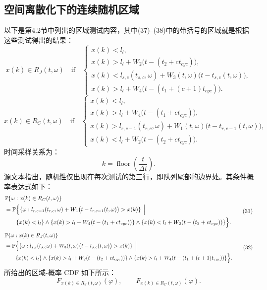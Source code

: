 \documentclass{article}
\begin{document}
\subsection*{空间离散化下的连续随机区域}
以下是第4.2节中列出的区域测试内容，其中(37)--(38)中的带括号的区域就是根据这些测试得出的结果：
\begin{equation}
x(k)\in R_J(t,\omega)\quad\text{if}\quad
\begin{cases}
x(k)<l_l,\\
x(k)>l_l+W_2\bigl(t-(t_2+ct_{cyc})\bigr),\\
x(k)<l_{s,c}(t_{s,c},\omega)+W_3(t,\omega)\bigl(t-t_{s,c}(t,\omega)\bigr),\\
x(k)>l_l+W_4\bigl(t-(t_1+(c+1)t_{cyc})\bigr).
\end{cases}
\tag{29}
\end{equation}
\begin{equation}
x(k)\in R_C(t,\omega)\quad\text{if}\quad
\begin{cases}
x(k)<l_l,\\
x(k)>l_l+W_4\bigl(t-(t_1+ct_{cyc})\bigr),\\
x(k)>l_{r,c-1}(t_{r,c},\omega)+W_1(t,\omega)\bigl(t-t_{r,c-1}(t,\omega)\bigr),\\
x(k)<l_l+W_2\bigl(t-(t_2+ct_{cyc})\bigr).
\end{cases}
\tag{30}
\end{equation}
时间采样关系为：
\[
k=\operatorname{floor}\left(\frac{t}{\Delta t}\right).
\]
源文本指出，随机性仅出现在每次测试的第三行，即队列尾部的边界处。其条件概率表达式如下：
\begin{equation}
\begin{aligned}
&\mathbb P\{\omega:x(k)\in R_C(t,\omega)\}\\
&=\mathbb P\Bigl\{
\{\omega:l_{r,c-1}(t_{r,c},\omega)
+W_1\bigl(t-t_{r,c-1}(t,\omega)\bigr)>x(k)\}\,\Bigm|\\
&\hspace{2em}\{x(k)<l_l\}\wedge
\{x(k)>l_l+W_4(t-(t_1+ct_{cyc}))\}\wedge
\{x(k)<l_l+W_2(t-(t_2+ct_{cyc}))\}
\Bigr\}.
\end{aligned}
\tag{31}
\end{equation}
\begin{equation}
\begin{aligned}
&\mathbb P\{\omega:x(k)\in R_J(t,\omega)\}\\
&=\mathbb P\Bigl\{
\{\omega:l_{s,c}(t_{s,c}\omega)
+W_3(t,\omega)\bigl(t-t_{s,c}(t,\omega)\bigr)>x(k)\}\,\Bigm|\\
&\hspace{2em}\{x(k)<l_l\}\wedge
\{x(k)>l_l+W_2(t-(t_2+ct_{cyc}))\}\wedge
\{x(k)>l_l+W_4(t-(t_1+(c+1)t_{cyc}))\}
\Bigr\}.
\end{aligned}
\tag{32}
\end{equation}
所给出的区域-概率 CDF 如下所示：
\[
F_{x(k)\in R_J(t,\omega)}(\varphi),\qquad
F_{x(k)\in R_C(t,\omega)}(\varphi).
\]
\end{document}
